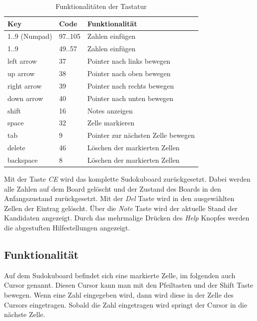 \begin{table}[H]
	\centering
	\begin{tabular}{lll}
		\hline
		Key         & Code    & Funktionalität                     \\ \hline
		1..9 (Numpad)       & 97..105 & Zahlen einfügen                    \\
		1..9        & 49..57  & Zahlen einfügen                    \\
		left arrow  & 37      & Pointer nach links bewegen         \\
		up arrow    & 38      & Pointer nach oben bewegen          \\
		right arrow & 39      & Pointer nach rechts bewegen        \\
		down arrow  & 40      & Pointer nach unten bewegen         \\
		shift       & 16      & Notes anzeigen                     \\
		space       & 32      & Zelle markieren                    \\
		tab         & 9       & Pointer zur nächsten Zelle bewegen \\
		delete      & 46      & Löschen der markierten Zellen      \\
		backspace   & 8       & Löschen der markierten Zellen      \\ \hline
	\end{tabular}%
	\caption{Funktionalitäten der Tastatur}
	\label{tab:tastatur}
\end{table}

Mit der Taste \textit{\ac{CE}} wird das komplette Sudokuboard zurückgesetzt. Dabei werden alle Zahlen auf dem Board gelöscht und der Zustand des Boards in den Anfangszustand zurückgesetzt. Mit der \textit{Del} Taste wird in den ausgewählten Zellen der Eintrag gelöscht. Über die \textit{Note} Taste wird der aktuelle Stand der Kandidaten angezeigt. Durch das mehrmalige Drücken des \textit{Help} Knopfes werden die abgestuften Hilfestellungen angezeigt.

\subsection{Funktionalität}

Auf dem Sudokuboard befindet sich eine markierte Zelle, im folgenden auch Cursor genannt. Diesen Cursor kann man mit den Pfeiltasten und der Shift Taste bewegen. Wenn eine Zahl eingegeben wird, dann wird diese in der Zelle des Cursors eingetragen. Sobald die Zahl eingetragen wird springt der Cursor in die nächste Zelle. 

